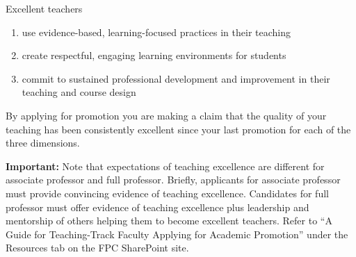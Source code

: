 \documentclass[11pt,titlepage]{article}
\begin{document}
Excellent teachers
\begin{enumerate}
  \item use evidence-based, learning-focused practices in their teaching
  \item create respectful, engaging learning environments for students
  \item commit to sustained professional development and improvement in their teaching and course design
\end{enumerate}

By applying for promotion you are making a claim that the quality of your teaching has been consistently excellent since your last promotion for each of the three dimensions.

\textbf{Important:} Note that expectations of teaching excellence are different for associate professor and full professor.
Briefly, applicants for associate professor must provide convincing evidence of teaching excellence.
Candidates for full professor must offer evidence of teaching excellence plus leadership and mentorship of others helping them to become excellent teachers.
Refer to ``A Guide for Teaching-Track Faculty Applying for Academic Promotion'' under the Resources tab on the \gls{FPC} SharePoint site.
\end{document}
